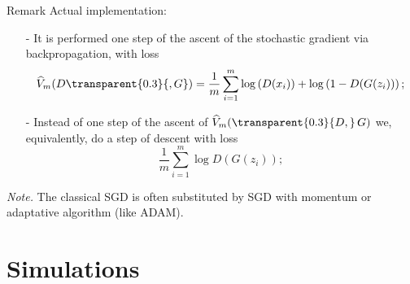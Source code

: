 \documentclass{beamer}
\begin{document}
	\begin{frame}
		\begin{block}{Remark}
			Actual implementation:
			\begin{itemize}
				\item[-] 
					{} It is performed one step of the ascent of the stochastic gradient via backpropagation, with loss 
					\vspace{-0.3cm}
					\begin{equation*}
						\widehat{V}_m(D {\transparent{0.3}{, G}}) = \frac{1}{m} \sum_{i = 1}^{m} \log{D(x_i)} + \log{1 - D(G(z_i))};
					\end{equation*}
					\vspace{-0.6cm}
				\item[-] 
				{} Instead of one step of the ascent of $\widehat{V}_m({\transparent{0.3}{D,}} \, G)$ we, equivalently, do a step of descent with loss 
					\vspace{-0.3cm}
					\begin{equation*}
						\frac{1}{m} \sum_{i = 1}^{m} \log{D(G(z_i))};
					\end{equation*}
			\end{itemize}
			\textit{Note.} The classical SGD is often substituted by SGD with momentum or adaptative algorithm (like ADAM).
		\end{block}
	\end{frame}

	\section{Simulations}
\end{document}
